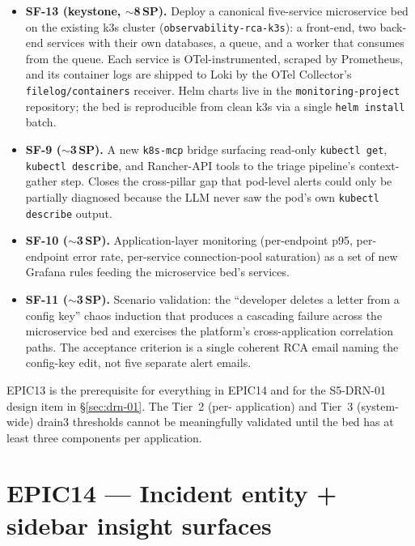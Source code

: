 \documentclass[11pt,a4paper,oneside]{report}
\begin{document}
\begin{itemize}
  \item \textbf{SF-13 (keystone, $\sim$8\,SP).}  Deploy a
        canonical five-service microservice bed on the existing
        k3s cluster (\texttt{observability-rca-k3s}): a
        front-end, two back-end services with their own
        databases, a queue, and a worker that consumes from the
        queue.  Each service is OTel-instrumented, scraped by
        Prometheus, and its container logs are shipped to Loki
        by the OTel Collector's \texttt{filelog/containers}
        receiver.  Helm charts live in the
        \texttt{monitoring-project} repository; the bed is
        reproducible from clean k3s via a single
        \texttt{helm install} batch.
  \item \textbf{SF-9 ($\sim$3\,SP).}  A new \texttt{k8s-mcp}
        bridge surfacing read-only \texttt{kubectl get},
        \texttt{kubectl describe}, and Rancher-API tools to the
        triage pipeline's context-gather step.  Closes the
        cross-pillar gap that pod-level alerts could only be
        partially diagnosed because the LLM never saw the pod's
        own \texttt{kubectl describe} output.
  \item \textbf{SF-10 ($\sim$3\,SP).}  Application-layer
        monitoring (per-endpoint p95, per-endpoint error rate,
        per-service connection-pool saturation) as a set of new
        Grafana rules feeding the microservice bed's services.
  \item \textbf{SF-11 ($\sim$3\,SP).}  Scenario validation: the
        ``developer deletes a letter from a config key'' chaos
        induction that produces a cascading failure across the
        microservice bed and exercises the platform's
        cross-application correlation paths.  The acceptance
        criterion is a single coherent RCA email naming the
        config-key edit, not five separate alert emails.
\end{itemize}

EPIC13 is the prerequisite for everything in EPIC14 and for the
S5-DRN-01 design item in \S\ref{sec:drn-01}.  The Tier~2 (per-
application) and Tier~3 (system-wide) drain3 thresholds cannot
be meaningfully validated until the bed has at least three
components per application.

\section{EPIC14 --- Incident entity + sidebar insight surfaces}
\end{document}

